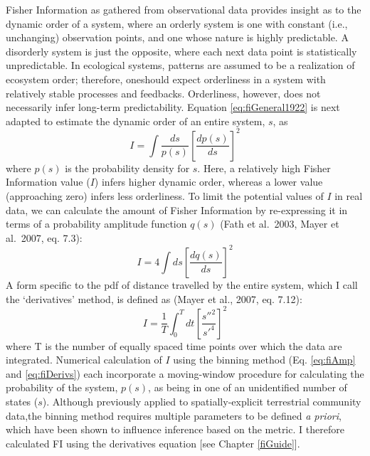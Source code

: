 \documentclass[12pt,twoside,openany]{reedthesis}
\begin{document}
Fisher Information as gathered from observational data provides insight as to the dynamic order of a system, where an orderly system is one with constant (i.e., unchanging) observation points, and one whose nature is highly predictable. A disorderly system is just the opposite, where each next data point is statistically unpredictable. In ecological systems, patterns are assumed to be a realization of ecosystem order; therefore, oneshould expect orderliness in a system with relatively stable processes and feedbacks. Orderliness, however, does not necessarily infer long-term predictability. Equation \eqref{eq:fiGeneral1922} is next adapted to estimate the dynamic order of an entire system, \(s\), as
\begin{equation} 
  I = \int \frac{ds}{p(s)}\left[\frac{dp(s)}{ds}\right]^2
  \label{eq:fi73c}
\end{equation}
where \(p(s)\) is the probability density for \(s\). Here, a relatively high Fisher Information value (\(I\)) infers higher dynamic order, whereas a lower value (approaching zero) infers less orderliness. To limit the potential values of \(I\) in real data, we can calculate the amount of Fisher Information by re-expressing it in terms of a probability amplitude function \(q(s)\) (Fath et al.~2003, Mayer et al.~2007, eq. 7.3):
\begin{equation}
  I = 4 \int ds\left[\frac{dq(s)}{ds}\right]^2
  \label{eq:fiAmp}
\end{equation}
A form specific to the pdf of distance travelled by the entire system, which I call the `derivatives' method, is defined as (Mayer et al., 2007, eq. 7.12):
\begin{equation}
  I = \frac{1}{T} \int_0^T dt\left[\frac{s''^2}{s'^4}\right]^2
  \label{eq:fiDerivs}
\end{equation}
where T is the number of equally spaced time points over which the data are integrated. Numerical calculation of \(I\) using the binning method (Eq. \eqref{eq:fiAmp} and \eqref{eq:fiDerivs}) each incorporate a moving-window procedure for calculating the probability of the system, \(p(s)\), as being in one of an unidentified number of states (\(s\)). Although previously applied to spatially-explicit terrestrial community data,the binning method requires multiple parameters to be defined \emph{a priori}, which have been shown to influence inference based on the metric. I therefore calculated FI using the derivatives equation {[}see Chapter \ref{fiGuide}{]}.
\end{document}
